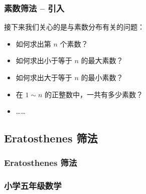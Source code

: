 \documentclass{../pkslide}
\begin{document}

\begin{frame}
  \frametitle{素数筛法 -- 引入}
  
  接下来我们关心的是与素数分布有关的问题：
  
  \begin{itemize}
    \item 如何求出第 $n$ 个素数？
    \item 如何求出小于等于 $n$ 的最大素数？
    \item 如何求出大于等于 $n$ 的最小素数？
    \item 在 $1 \sim n$ 的正整数中，一共有多少素数？
    \item ……
  \end{itemize}
  
\end{frame}


\subsection{Eratosthenes 筛法}
\subsubsection*{Eratosthenes 筛法}


\begin{frame}
  \frametitle{小学五年级数学}
  
\end{frame}
\end{document}
